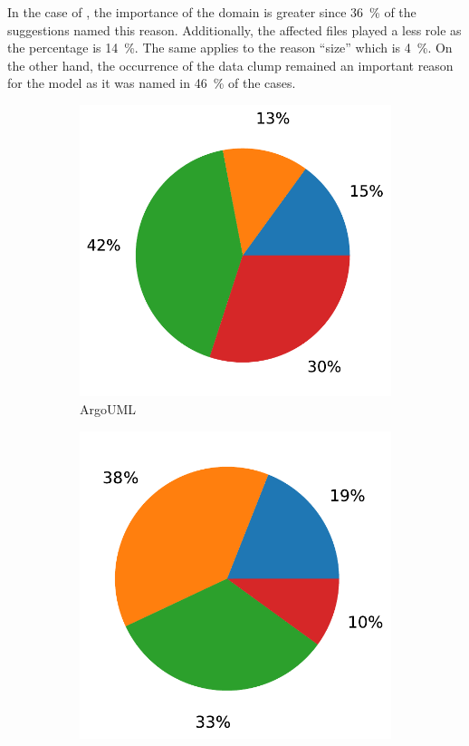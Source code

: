 In the case of \dolphinscheduler, the importance of the domain is greater since 36~\% of the suggestions named this reason. Additionally, the affected files played a less role as the percentage is 14~\%. The same applies to the reason \enquote{size} which is 4~\%. On the other hand, the occurrence of the data clump remained an important reason for the model as it was named in 46~\% of the cases. 
\begin{figure}[ht!]
    \centering
    \begin{subfigure}[t]{0.48\columnwidth}
        \includegraphics[width=1\columnwidth]{figures/chapter5/filter_reason_argouml.pdf}
        \caption{ArgoUML}
        \label{fig:filter_reason_argouml}
    \end{subfigure}
            \begin{subfigure}[t]{0.48\columnwidth}
        \includegraphics[width=1\columnwidth]{figures/chapter5/filter_reason_type_rocketmq.pdf}

\end{subfigure}
\end{figure}
